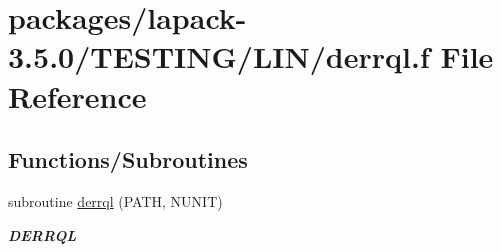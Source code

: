 \hypertarget{derrql_8f}{}\section{packages/lapack-\/3.5.0/\+T\+E\+S\+T\+I\+N\+G/\+L\+I\+N/derrql.f File Reference}
\label{derrql_8f}
\subsection*{Functions/\+Subroutines}
\begin{DoxyCompactItemize}
\item 
subroutine \hyperlink{group__double__lin_ga60566d309768aedb3f8e1b725a59b7de}{derrql} (P\+A\+T\+H, N\+U\+N\+I\+T)
\begin{DoxyCompactList}\small\item\em {\bfseries D\+E\+R\+R\+Q\+L} \end{DoxyCompactList}\end{DoxyCompactItemize}
